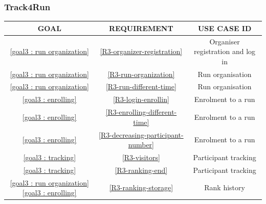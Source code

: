        \subsubsection{Track4Run}
        
        \begin{table}[H]
            	\centering
                \begin{tabular}{|c|c|c|}
                    \hline
                     \rowcolor[HTML]{8BC34A} \textbf{ GOAL} & \textbf{ REQUIREMENT} & \textbf{USE CASE ID}\\
                    \hline
                    \ref{goal3 : run organization} & \ref{R3-organizer-registration} & Organiser registration and log in\\
                    \hline
                    \ref{goal3 : run organization}  & \ref{R3-run-organization} & Run organisation\\
                    \hline
                    \ref{goal3 : run organization}  & \ref{R3-run-different-time} & Run organisation\\
                    \hline
                    \ref{goal3 : enrolling}  & \ref{R3-login-enrollin} & Enrolment to a run\\
                    \hline
                    \ref{goal3 : enrolling}  & \ref{R3-enrolling-different-time}& Enrolment to a run\\
                    \hline
                    \ref{goal3 : enrolling}  & \ref{R3-decreasing-participant-number}& Enrolment to a run\\
                    \hline
                    \ref{goal3 : tracking}  & \ref{R3-visitors} & Participant tracking\\
                    \hline
                     \ref{goal3 : tracking}  & \ref{R3-ranking-end} & Participant tracking\\
                    \hline
                     \ref{goal3 : run organization} \ref{goal3 : enrolling}  & \ref{R3-ranking-storage}& Rank history\\
                    \hline
                \end{tabular}  
            \end{table}